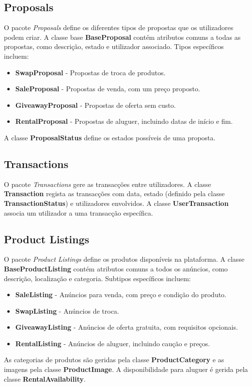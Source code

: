 \documentclass[a4paper, 12pt]{article} %
\begin{document}
\subsection{Proposals}
O pacote \textit{Proposals} define os diferentes tipos de propostas que os utilizadores podem criar. A classe base \textbf{BaseProposal} contém atributos comuns a todas as propostas, como descrição, estado e utilizador associado. Tipos específicos incluem:
\begin{itemize}
	\item \textbf{SwapProposal} - Propostas de troca de produtos.
	\item \textbf{SaleProposal} - Propostas de venda, com um preço proposto.
	\item \textbf{GiveawayProposal} - Propostas de oferta sem custo.
	\item \textbf{RentalProposal} - Propostas de aluguer, incluindo datas de início e fim.
\end{itemize}
A classe \textbf{ProposalStatus} define os estados possíveis de uma proposta.

\subsection{Transactions}
O pacote \textit{Transactions} gere as transacções entre utilizadores. A classe \textbf{Transaction} regista as transacções com data, estado (definido pela classe \textbf{TransactionStatus}) e utilizadores envolvidos. A classe \textbf{UserTransaction} associa um utilizador a uma transacção específica.

\subsection{Product Listings}
O pacote \textit{Product Listings} define os produtos disponíveis na plataforma. A classe \textbf{BaseProductListing} contém atributos comuns a todos os anúncios, como descrição, localização e categoria. Subtipos específicos incluem:
\begin{itemize}
	\item \textbf{SaleListing} - Anúncios para venda, com preço e condição do produto.
	\item \textbf{SwapListing} - Anúncios de troca.
	\item \textbf{GiveawayListing} - Anúncios de oferta gratuita, com requisitos opcionais.
	\item \textbf{RentalListing} - Anúncios de aluguer, incluindo caução e preços.
\end{itemize}
As categorias de produtos são geridas pela classe \textbf{ProductCategory} e as imagens pela classe \textbf{ProductImage}. A disponibilidade para aluguer é gerida pela classe \textbf{RentalAvailability}.
\end{document}
